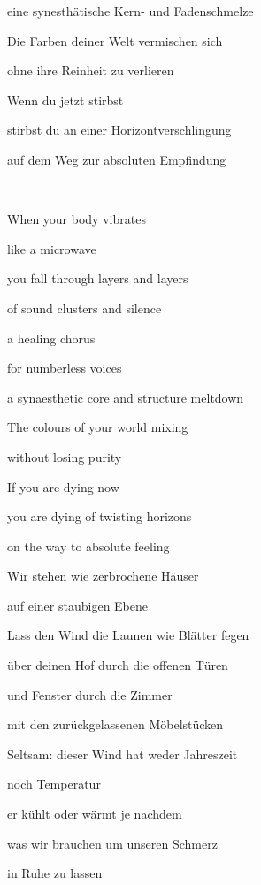 \documentclass[a4paper]{article}
\begin{document}
eine synesthätische Kern- und Fadenschmelze

Die Farben deiner Welt vermischen sich

ohne ihre Reinheit zu verlieren

Wenn du jetzt stirbst

stirbst du an einer Horizontverschlingung

auf dem Weg zur absoluten Empfindung

~



\bigskip

When your body vibrates

like a microwave

you fall through layers and layers

of sound clusters and silence

a healing chorus

for numberless voices

a synaesthetic core and structure meltdown

The colours of your world mixing

without losing purity

If you are dying now

you are dying of twisting horizons

on the way to absolute feeling


\bigskip


\bigskip



\bigskip

Wir stehen wie zerbrochene Häuser

auf einer staubigen Ebene

Lass den Wind die Launen wie Blätter fegen


\bigskip

über deinen Hof durch die offenen Türen 

und Fenster durch die Zimmer 

mit den zurückgelassenen Möbelstücken


\bigskip

Seltsam: dieser Wind hat weder Jahreszeit 

noch Temperatur 

er kühlt oder wärmt je nachdem


\bigskip

was wir brauchen um unseren Schmerz 

in Ruhe zu lassen
\end{document}
